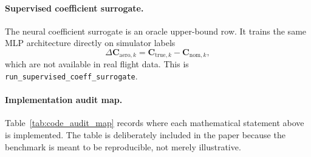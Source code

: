\documentclass[11pt]{article}
\begin{document}
\paragraph{Supervised coefficient surrogate.}
The neural coefficient surrogate is an oracle upper-bound row. It trains the
same MLP architecture directly on simulator labels
\[
    \Delta\mathbf{C}_{\mathrm{aero},k}
    =
    \mathbf{C}_{\mathrm{true},k}-\mathbf{C}_{\mathrm{nom},k},
\]
which are not available in real flight data. This is
\texttt{run\_supervised\_coeff\_surrogate}.

\paragraph{Implementation audit map.}
Table~\ref{tab:code_audit_map} records where each mathematical statement above
is implemented. The table is deliberately included in the paper because the
benchmark is meant to be reproducible, not merely illustrative.
\end{document}
